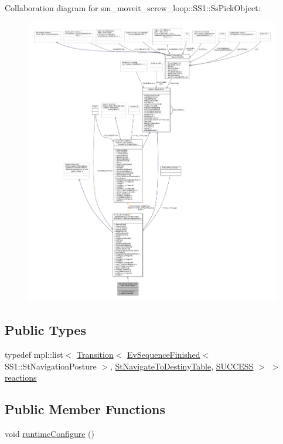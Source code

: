 Collaboration diagram for sm\+\_\+moveit\+\_\+screw\+\_\+loop\+:\+:S\+S1\+:\+:Ss\+Pick\+Object\+:
\nopagebreak
\begin{figure}[H]
\begin{center}
\leavevmode
\includegraphics[width=350pt]{structsm__moveit__screw__loop_1_1SS1_1_1SsPickObject__coll__graph}
\end{center}
\end{figure}
\subsection*{Public Types}
\begin{DoxyCompactItemize}
\item 
typedef mpl\+::list$<$ \hyperlink{classsmacc_1_1Transition}{Transition}$<$ \hyperlink{structsmacc_1_1default__events_1_1EvSequenceFinished}{Ev\+Sequence\+Finished}$<$ S\+S1\+::\+St\+Navigation\+Posture $>$, \hyperlink{structsm__moveit__screw__loop_1_1StNavigateToDestinyTable}{St\+Navigate\+To\+Destiny\+Table}, \hyperlink{structsmacc_1_1default__transition__tags_1_1SUCCESS}{S\+U\+C\+C\+E\+SS} $>$ $>$ \hyperlink{structsm__moveit__screw__loop_1_1SS1_1_1SsPickObject_a16f7c53c06a10801a24d51dc8c48b8fd}{reactions}
\end{DoxyCompactItemize}
\subsection*{Public Member Functions}
\begin{DoxyCompactItemize}
\item 
void \hyperlink{structsm__moveit__screw__loop_1_1SS1_1_1SsPickObject_a80bccb931691121dc9b197da9c4d3412}{runtime\+Configure} ()
\end{DoxyCompactItemize}
